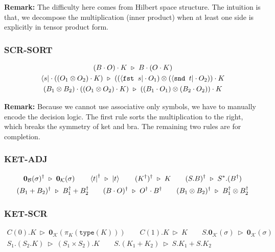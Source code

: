 \documentclass[manuscript, review, timestamp]{acmart}
\newcommand*{\type}{\texttt{type}}
\newcommand*{\fst}{\texttt{fst }}
\newcommand*{\snd}{\texttt{snd }}
\newcommand*{\reduce}{\ \triangleright\ }
\begin{document}
\textbf{Remark:} The difficulty here comes from Hilbert space structure. The intuition is that, we decompose the multiplication (inner product) when at least one side is explicitly in tensor product form.

\subsubsection*{\textsf{SCR-SORT}}
\begin{gather*}
  (B \cdot O) \cdot K \reduce B \cdot (O \cdot K) \\
  \bra{s} \cdot ((O_1 \otimes O_2) \cdot K) \reduce ((\bra{\fst s} \cdot O_1) \otimes (\bra{\snd t} \cdot O_2)) \cdot K \\
  (B_1 \otimes B_2) \cdot ((O_1 \otimes O_2) \cdot K) \reduce ((B_1 \cdot O_1) \otimes (B_2 \cdot O_2)) \cdot K \\
\end{gather*}


\textbf{Remark:} Because we cannot use associative only symbols, we have to manually encode the decision logic. The first rule sorts the multiplication to the right, which breaks the symmetry of ket and bra. The remaining two rules are for completion.

\subsubsection*{\textsf{KET-ADJ}}
\begin{gather*}
  \textbf{0}_\mathcal{B}(\sigma)^\dagger \reduce \textbf{0}_\mathcal{K}(\sigma)
  \qquad
  \bra{t}^\dagger \reduce \ket{t}
  \qquad
  (K^\dagger)^\dagger \reduce K
  \qquad
  (S.B)^\dagger \reduce S^*.(B^\dagger) \\
  (B_1 + B_2)^\dagger \reduce B_1^\dagger + B_2^\dagger
  \qquad
  (B \cdot O)^\dagger \reduce O^\dagger \cdot B^\dagger
  \qquad
  (B_1 \otimes B_2)^\dagger \reduce B_1^\dagger \otimes B_2^\dagger
\end{gather*}

\subsubsection*{\textsf{KET-SCR}}
\begin{gather*}
  C(0).K \reduce \textbf{0}_{\mathcal{K}}(\pi_K(\type(K)))
  \qquad
  C(1).K \reduce K
  \qquad
  S.\textbf{0}_\mathcal{K}(\sigma) \reduce \textbf{0}_\mathcal{K}(\sigma)
  \\
  S_1.(S_2.K) \reduce (S_1 \times S_2).K
  \qquad
  S.(K_1 + K_2) \reduce S.K_1 + S.K_2
\end{gather*}
\end{document}
